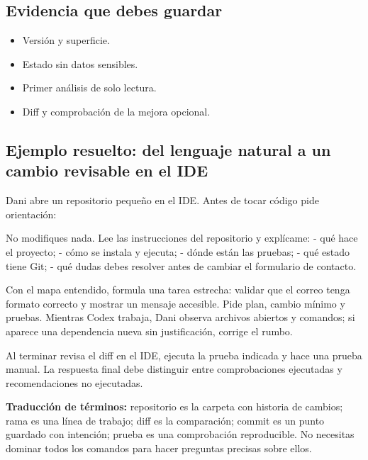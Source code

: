 \documentclass[10pt,a4paper,openany]{book}
\providecommand{\tightlist}{\setlength{\itemsep}{0.18em}\setlength{\parskip}{0pt}}
\newenvironment{Shaded}{}{}
\newcommand{\NormalTok}[1]{#1}
\renewenvironment{Shaded}
  {\begin{tcolorbox}[
    enhanced,
    breakable,
    colback=CodeBg,
    colframe=Border,
    boxrule=0.5pt,
    arc=2mm,
    left=3mm,
    right=3mm,
    top=2.2mm,
    bottom=2.2mm,
    before skip=0.8em,
    after skip=0.9em
  ]}
  {\end{tcolorbox}}
\begin{document}
\subsection{Evidencia que debes
guardar}\label{evidencia-que-debes-guardar-18}

\begin{itemize}
\tightlist
\item
  Versión y superficie.
\item
  Estado sin datos sensibles.
\item
  Primer análisis de solo lectura.
\item
  Diff y comprobación de la mejora opcional.
\end{itemize}

\subsection{Ejemplo resuelto: del lenguaje natural a un cambio revisable
en el
IDE}\label{ejemplo-resuelto-del-lenguaje-natural-a-un-cambio-revisable-en-el-ide}

Dani abre un repositorio pequeño en el IDE. Antes de tocar código pide
orientación:

\begin{Shaded}
\begin{Highlighting}[]
\NormalTok{No modifiques nada. Lee las instrucciones del repositorio y explícame:}
\NormalTok{{-} qué hace el proyecto;}
\NormalTok{{-} cómo se instala y ejecuta;}
\NormalTok{{-} dónde están las pruebas;}
\NormalTok{{-} qué estado tiene Git;}
\NormalTok{{-} qué dudas debes resolver antes de cambiar el formulario de contacto.}
\end{Highlighting}
\end{Shaded}

Con el mapa entendido, formula una tarea estrecha: validar que el correo
tenga formato correcto y mostrar un mensaje accesible. Pide plan, cambio
mínimo y pruebas. Mientras Codex trabaja, Dani observa archivos abiertos
y comandos; si aparece una dependencia nueva sin justificación, corrige
el rumbo.

Al terminar revisa el diff en el IDE, ejecuta la prueba indicada y hace
una prueba manual. La respuesta final debe distinguir entre
comprobaciones ejecutadas y recomendaciones no ejecutadas.

\textbf{Traducción de términos:} repositorio es la carpeta con historia
de cambios; rama es una línea de trabajo; diff es la comparación; commit
es un punto guardado con intención; prueba es una comprobación
reproducible. No necesitas dominar todos los comandos para hacer
preguntas precisas sobre ellos.
\end{document}
